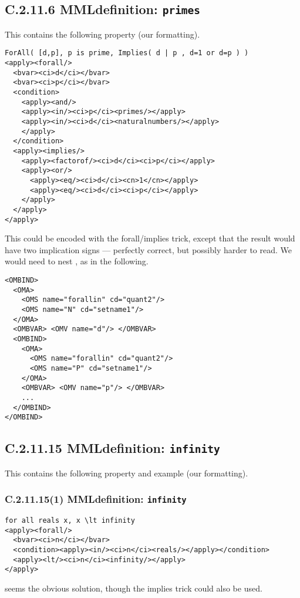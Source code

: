 \documentclass{llncs}
\begin{document}
{\subsection{C.2.11.6 MMLdefinition: {\tt primes}}\label{C2116}
This contains the following property (our formatting).
\begin{lstlisting}[language=MathML2]
ForAll( [d,p], p is prime, Implies( d | p , d=1 or d=p ) ) 
<apply><forall/>
  <bvar><ci>d</ci></bvar>
  <bvar><ci>p</ci></bvar>
  <condition>
    <apply><and/>
    <apply><in/><ci>p</ci><primes/></apply>
    <apply><in/><ci>d</ci><naturalnumbers/></apply>
    </apply>
  </condition>
  <apply><implies/>
    <apply><factorof/><ci>d</ci><ci>p</ci></apply>
    <apply><or/>
      <apply><eq/><ci>d</ci><cn>1</cn></apply>
      <apply><eq/><ci>d</ci><ci>p</ci></apply>
    </apply>
  </apply>
</apply>
\end{lstlisting}
This could be encoded with the forall/implies trick, except that the result
would have two implication signs --- perfectly correct, but possibly harder to
read. We would need to nest {}, as in the following.
\begin{lstlisting}
<OMBIND>
  <OMA>
    <OMS name="forallin" cd="quant2"/>
    <OMS name="N" cd="setname1"/>
  </OMA>
  <OMBVAR> <OMV name="d"/> </OMBVAR>
  <OMBIND>
    <OMA>
      <OMS name="forallin" cd="quant2"/>
      <OMS name="P" cd="setname1"/>
    </OMA>
    <OMBVAR> <OMV name="p"/> </OMBVAR>
    ...
  </OMBIND>
</OMBIND> 
\end{lstlisting}
\subsection{C.2.11.15 MMLdefinition: {\tt infinity}}\label{C21115}
This contains the following property and example (our formatting).
\subsubsection{C.2.11.15(1) MMLdefinition: {\tt infinity}}\label{C211151}
\begin{lstlisting}[language=MathML2] 
    for all reals x, x \lt infinity
<apply><forall/>
  <bvar><ci>n</ci></bvar>
  <condition><apply><in/><ci>n</ci><reals/></apply></condition>
  <apply><lt/><ci>n</ci><infinity/></apply>
</apply>
\end{lstlisting}
{} seems the obvious solution, though the implies trick
could also be used.
}
\end{document}
